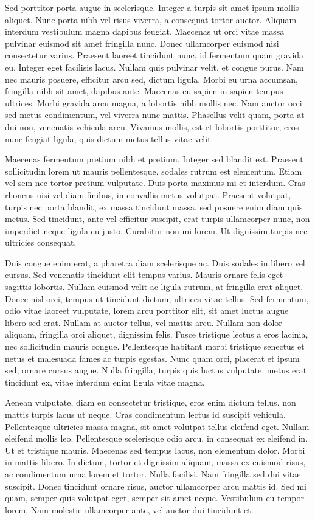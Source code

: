 \documentclass[10pt]{article}
\begin{document}
	Sed porttitor porta augue in scelerisque. Integer a turpis sit amet ipsum mollis aliquet. Nunc porta nibh vel risus viverra, a consequat tortor auctor. Aliquam interdum vestibulum magna dapibus feugiat. Maecenas ut orci vitae massa pulvinar euismod sit amet fringilla nunc. Donec ullamcorper euismod nisi consectetur varius. Praesent laoreet tincidunt nunc, id fermentum quam gravida eu. Integer eget facilisis lacus. Nullam quis pulvinar velit, et congue purus. Nam nec mauris posuere, efficitur arcu sed, dictum ligula. Morbi eu urna accumsan, fringilla nibh sit amet, dapibus ante. Maecenas eu sapien in sapien tempus ultrices. Morbi gravida arcu magna, a lobortis nibh mollis nec. Nam auctor orci sed metus condimentum, vel viverra nunc mattis. Phasellus velit quam, porta at dui non, venenatis vehicula arcu. Vivamus mollis, est et lobortis porttitor, eros nunc feugiat ligula, quis dictum metus tellus vitae velit.
	
	Maecenas fermentum pretium nibh et pretium. Integer sed blandit est. Praesent sollicitudin lorem ut mauris pellentesque, sodales rutrum est elementum. Etiam vel sem nec tortor pretium vulputate. Duis porta maximus mi et interdum. Cras rhoncus nisi vel diam finibus, in convallis metus volutpat. Praesent volutpat, turpis nec porta blandit, ex massa tincidunt massa, sed posuere enim diam quis metus. Sed tincidunt, ante vel efficitur suscipit, erat turpis ullamcorper nunc, non imperdiet neque ligula eu justo. Curabitur non mi lorem. Ut dignissim turpis nec ultricies consequat.
	
	Duis congue enim erat, a pharetra diam scelerisque ac. Duis sodales in libero vel cursus. Sed venenatis tincidunt elit tempus varius. Mauris ornare felis eget sagittis lobortis. Nullam euismod velit ac ligula rutrum, at fringilla erat aliquet. Donec nisl orci, tempus ut tincidunt dictum, ultrices vitae tellus. Sed fermentum, odio vitae laoreet vulputate, lorem arcu porttitor elit, sit amet luctus augue libero sed erat. Nullam at auctor tellus, vel mattis arcu. Nullam non dolor aliquam, fringilla orci aliquet, dignissim felis. Fusce tristique lectus a eros lacinia, nec sollicitudin mauris congue. Pellentesque habitant morbi tristique senectus et netus et malesuada fames ac turpis egestas. Nunc quam orci, placerat et ipsum sed, ornare cursus augue. Nulla fringilla, turpis quis luctus vulputate, metus erat tincidunt ex, vitae interdum enim ligula vitae magna.
	
	Aenean vulputate, diam eu consectetur tristique, eros enim dictum tellus, non mattis turpis lacus ut neque. Cras condimentum lectus id suscipit vehicula. Pellentesque ultricies massa magna, sit amet volutpat tellus eleifend eget. Nullam eleifend mollis leo. Pellentesque scelerisque odio arcu, in consequat ex eleifend in. Ut et tristique mauris. Maecenas sed tempus lacus, non elementum dolor. Morbi in mattis libero. In dictum, tortor et dignissim aliquam, massa ex euismod risus, ac condimentum urna lorem et tortor. Nulla facilisi. Nam fringilla sed dui vitae suscipit. Donec tincidunt ornare risus, auctor ullamcorper arcu mattis id. Sed mi quam, semper quis volutpat eget, semper sit amet neque. Vestibulum eu tempor lorem. Nam molestie ullamcorper ante, vel auctor dui tincidunt et.
	
\end{document}
